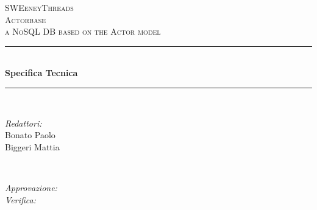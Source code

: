 \documentclass[a4paper]{article}
\begin{document}
	
	\begin{titlepage}
		\newcommand{\HRule}{\rule{\linewidth}{0.5mm}} 
		\center  
		
		\textsc{\LARGE SWEeneyThreads}\\[1.5cm] 
		\textsc{\Large Actorbase}\\[0.5cm] 
		\textsc{\large a NoSQL DB based on the Actor model}\\[0.5cm]
		
		
		\HRule \\[0.4cm]
		{ \huge \bfseries Specifica Tecnica}\\[0.4cm] 
		\HRule \\[1.5cm]
		
		\begin{minipage}{0.4\textwidth}
			\begin{flushleft} \large
				\emph{Redattori:}\\
				Bonato Paolo \\
				Biggeri Mattia
			\end{flushleft}
		\end{minipage}
		~
		\begin{minipage}{0.4\textwidth}
			\begin{flushright} \large
				\emph{Approvazione:} \\
				\emph{Verifica:} \\
				 
			\end{flushright}
		\end{minipage}
		

\end{titlepage}
\end{document}
